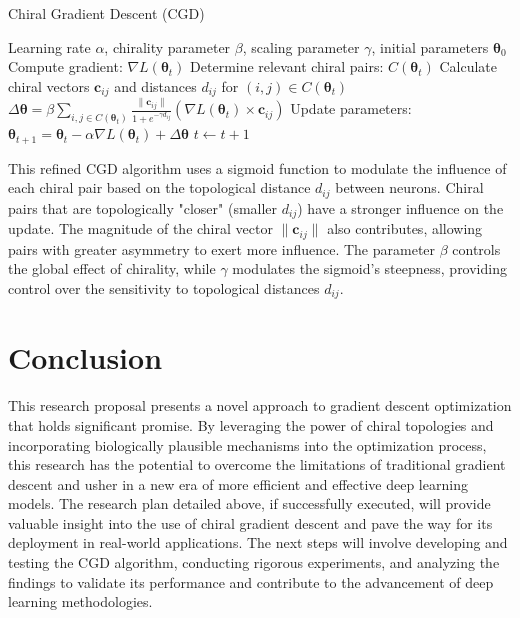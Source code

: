 \documentclass[12pt, a4paper]{article}
\begin{document}
\begin{algorithm}
\caption{Chiral Gradient Descent (CGD)}
\label{alg:cgd}
\begin{algorithmic}
\Require Learning rate \(\alpha\), chirality parameter \(\beta\), scaling parameter \(\gamma\), initial parameters \(\boldsymbol{\theta}_0\)
    \State Compute gradient: \(\nabla L(\boldsymbol{\theta}_t)\)
    \State Determine relevant chiral pairs: \(C(\boldsymbol{\theta}_t)\)
    \State Calculate chiral vectors \(\mathbf{c}_{ij}\) and distances \(d_{ij}\) for \((i, j) \in C(\boldsymbol{\theta}_t)\)
    \State \(\Delta \boldsymbol{\theta} =  \beta \sum_{i,j \in C(\boldsymbol{\theta}_t)} \frac{\| \mathbf{c}_{ij} \|}{1 + e^{-\gamma d_{ij}}} (\nabla L(\boldsymbol{\theta}_t) \times \mathbf{c}_{ij})\)
    \State Update parameters: \(\boldsymbol{\theta}_{t+1} = \boldsymbol{\theta}_t - \alpha \nabla L(\boldsymbol{\theta}_t) + \Delta \boldsymbol{\theta}\)
    \State \(t \gets t + 1\)
\EndWhile
\end{algorithmic}
\end{algorithm}

This refined CGD algorithm uses a sigmoid function to modulate the influence of each chiral pair based on the topological distance \(d_{ij}\) between neurons. Chiral pairs that are topologically "closer" (smaller \(d_{ij}\)) have a stronger influence on the update. The magnitude of the chiral vector \(\| \mathbf{c}_{ij} \|\) also contributes, allowing pairs with greater asymmetry to exert more influence. The parameter \(\beta\) controls the global effect of chirality, while \(\gamma\) modulates the sigmoid's steepness, providing control over the sensitivity to topological distances \(d_{ij}\).


\section{Conclusion}
This research proposal presents a novel approach to gradient descent optimization that holds significant promise. By leveraging the power of chiral topologies and incorporating biologically plausible mechanisms into the optimization process, this research has the potential to overcome the limitations of traditional gradient descent and usher in a new era of more efficient and effective deep learning models. The research plan detailed above, if successfully executed, will provide valuable insight into the use of chiral gradient descent and pave the way for its deployment in real-world applications. The next steps will involve developing and testing the CGD algorithm, conducting rigorous experiments, and analyzing the findings to validate its performance and contribute to the advancement of deep learning methodologies.


\end{document}
